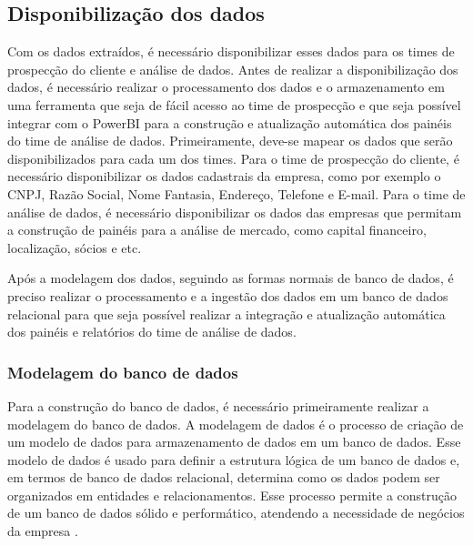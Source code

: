 \subsection{Disponibilização dos dados}

Com os dados extraídos, é necessário disponibilizar esses dados para os times de prospecção do cliente e análise de dados. Antes de realizar a disponibilização dos dados, é necessário realizar o processamento dos dados e o armazenamento em uma ferramenta que seja de fácil acesso ao time de prospecção e que seja possível integrar com o PowerBI para a construção e atualização automática dos painéis do time de análise de dados. Primeiramente, deve-se mapear os dados que serão disponibilizados para cada um dos times. Para o time de prospecção do cliente, é necessário disponibilizar os dados cadastrais da empresa, como por exemplo o CNPJ, Razão Social, Nome Fantasia, Endereço, Telefone e E-mail. Para o time de análise de dados, é necessário disponibilizar os dados das empresas que permitam a construção de painéis para a análise de mercado, como capital financeiro, localização, sócios e etc.

Após a modelagem dos dados, seguindo as formas normais de banco de dados, é preciso realizar o processamento e a ingestão dos dados em um banco de dados relacional para que seja possível realizar a integração e atualização automática dos painéis e relatórios do time de análise de dados.


\subsubsection{Modelagem do banco de dados}

Para a construção do banco de dados, é necessário primeiramente realizar a modelagem do banco de dados. A modelagem de dados é o processo de criação de um modelo de dados para armazenamento de dados em um banco de dados. Esse modelo de dados é usado para definir a estrutura lógica de um banco de dados e, em termos de banco de dados relacional, determina como os dados podem ser organizados em entidades e relacionamentos. Esse processo permite a construção de um banco de dados sólido e performático, atendendo a necessidade de negócios da empresa \cite{Golfarelli2003}.

